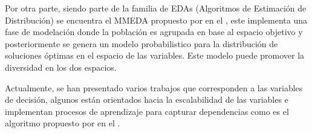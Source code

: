 Por otra parte, siendo parte de la familia de EDAs (Algoritmos de Estimación de Distribución) se encuentra el MMEDA propuesto por \citeauthor{zhou2009approximating} en el \citeyear{zhou2009approximating}, este implementa una fase de modelación donde la población es agrupada en base al espacio objetivo y posteriormente se genera un modelo probabilistico para la distribución de soluciones óptimas en el espacio de las variables.
%
Este modelo puede promover la diversidad en los dos espacios.


Actualmente, se han presentado varios trabajos que corresponden a las variables de decisión, algunos están orientados hacia la escalabilidad de las variables e implementan procesos de aprendizaje para capturar dependencias como es el algoritmo  propuesto por \citeauthor{ma2016multiobjective} en el \citeyear{ma2016multiobjective}.


